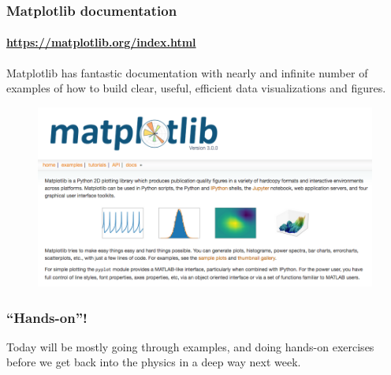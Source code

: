 \documentclass[hyperref={colorlinks=true}]{beamer}
\begin{document}
\begin{frame}%
  \frametitle{Matplotlib documentation}
  \framesubtitle{\url{https://matplotlib.org/index.html}}
  
  Matplotlib has fantastic documentation with nearly and infinite number of examples of how to build clear, useful, efficient data visualizations and figures.
  
  \begin{figure}
    \centering
    \includegraphics[width=0.95\columnwidth]{matplotlib.png}
  \end{figure}

\end{frame}


\begin{frame}%
  \frametitle{``Hands-on''!}
  
  Today will be mostly going through examples, and doing hands-on exercises before we get back into the physics in a deep way next week.

\end{frame}






%
%
%  

\end{document}
